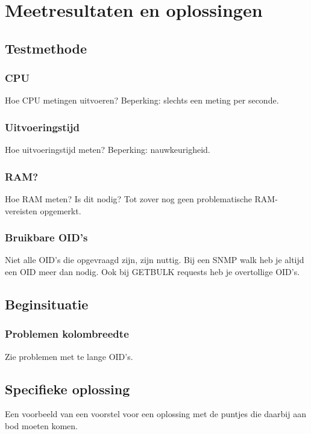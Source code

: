 \chapter{Meetresultaten en oplossingen}


\section{Testmethode}

\subsection{CPU}
Hoe CPU metingen uitvoeren? Beperking: slechts een meting per seconde.

\subsection{Uitvoeringstijd}
Hoe uitvoeringstijd meten? Beperking: nauwkeurigheid.

\subsection{RAM?}
Hoe RAM meten? Is dit nodig? Tot zover nog geen problematische RAM-vereisten opgemerkt.

\subsection{Bruikbare OID's}
Niet alle OID's die opgevraagd zijn, zijn nuttig. Bij een SNMP walk heb je altijd een OID meer dan nodig.
Ook bij GETBULK requests heb je overtollige OID's.


\section{Beginsituatie}

\subsection{Problemen kolombreedte}
Zie problemen met te lange OID's.

\section{Specifieke oplossing}
Een voorbeeld van een voorstel voor een oplossing met de puntjes die daarbij aan bod moeten komen.

